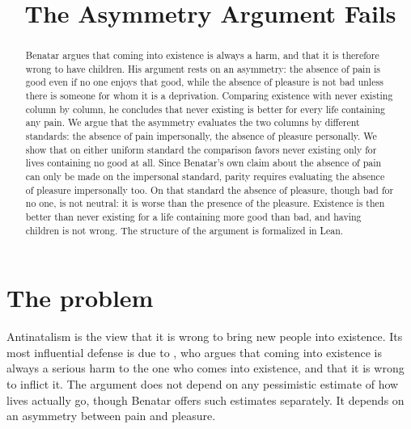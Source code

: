 \documentclass{situationist-preprint}
\title{The Asymmetry Argument Fails}
\begin{document}
\maketitle

\begin{abstract}
Benatar argues that coming into existence is always a harm, and that it is therefore wrong to have children. His argument rests on an asymmetry: the absence of pain is good even if no one enjoys that good, while the absence of pleasure is not bad unless there is someone for whom it is a deprivation. Comparing existence with never existing column by column, he concludes that never existing is better for every life containing any pain. We argue that the asymmetry evaluates the two columns by different standards: the absence of pain impersonally, the absence of pleasure personally. We show that on either uniform standard the comparison favors never existing only for lives containing no good at all. Since Benatar's own claim about the absence of pain can only be made on the impersonal standard, parity requires evaluating the absence of pleasure impersonally too. On that standard the absence of pleasure, though bad for no one, is not neutral: it is worse than the presence of the pleasure. Existence is then better than never existing for a life containing more good than bad, and having children is not wrong. The structure of the argument is formalized in Lean.
\end{abstract}

\section{The problem}

Antinatalism is the view that it is wrong to bring new people into existence. Its most influential defense is due to \citet{Benatar1997,Benatar2006}, who argues that coming into existence is always a serious harm to the one who comes into existence, and that it is wrong to inflict it. The argument does not depend on any pessimistic estimate of how lives actually go, though Benatar offers such estimates separately. It depends on an asymmetry between pain and pleasure.
\end{document}
